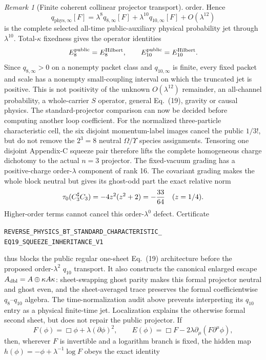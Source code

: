 \documentclass[11pt]{article}
\theoremstyle{definition}
\theoremstyle{remark}
\newtheorem{remark}[theorem]{Remark}
\begin{document}
\begin{remark}[Finite coherent collinear projector transport]
order.  Hence
\[
 \boxed{q_{\mathrm{phys},\infty}[F]
 =\lambda^8q_{8,\infty}[F]
 +\lambda^{10}q_{10,\infty}[F]+O(\lambda^{12})}
\]
is the complete selected all-time public-auxiliary physical probability jet
through $\lambda^{10}$.  Total-$\kappa$ fixedness gives the operator identities
\[
 E_8^{\rm public}=E_8^{\rm Hilbert},\qquad
 E_{10}^{\rm public}=E_{10}^{\rm Hilbert}.
\]
Since $q_{8,\infty}>0$ on a nonempty packet class and $q_{10,\infty}$ is
finite, every fixed packet and scale has a nonempty small-coupling interval
on which the truncated jet is positive.  This is not positivity of the
unknown $O(\lambda^{12})$ remainder, an all-channel probability, a
whole-carrier $S$ operator, general Eq.~(19), gravity or causal physics.
The standard-projector comparison can now be decided before computing another
loop coefficient.  For the normalized three-particle characteristic cell, the
six disjoint momentum-label images cancel the public \(1/3!\), but do not
remove the \(2^3=8\) neutral \(\Omega/\Upsilon\) species assignments.  Tensoring
one disjoint Appendix-C squeeze pair therefore lifts the complete homogeneous
charge dichotomy to the actual \(n=3\) projector.  The fixed-vacuum grading has
a positive-charge order-\(\lambda\) component of rank 16.  The covariant
grading makes the whole block neutral but gives its ghost-odd part the exact
relative norm
\[
 \tau_0(C_3^\sharp C_3)=-4z^2(z^2+2)=-{33\over64}\quad(z=1/4).
\]
Higher-order terms cannot cancel this order-\(\lambda^0\) defect.  Certificate
\par\noindent
\texttt{REVERSE\_PHYSICS\_BT\_STANDARD\_CHARACTERISTIC\_}\allowbreak
\texttt{EQ19\_SQUEEZE\_INHERITANCE\_V1}
\par\noindent
thus blocks the public regular one-sheet Eq.~(19) architecture before the
proposed order-\(\lambda^2\) \(q_{10}\) transport.  It also constructs the
canonical enlarged escape
\(A_{\rm dbl}=A\oplus\kappa A\kappa\): sheet-swapping ghost parity makes this
formal projector neutral and ghost even, and the sheet-averaged trace
preserves the formal coefficientwise \(q_8\)--\(q_{10}\) algebra.  The
time-normalization audit above prevents interpreting its \(q_{10}\) entry as
a physical finite-time jet.  Localization explains the
otherwise formal second sheet, but does not repair the public projector.  If
\[
 F(\phi)=\Box\phi+\lambda(\partial\phi)^2,
 \qquad
 E(\phi)=\Box F-2\lambda\partial_\mu(F\partial^\mu\phi),
\]
then, wherever \(F\) is invertible and a logarithm branch is fixed, the hidden
map \(h(\phi)=-\phi+\lambda^{-1}\log F\) obeys the exact identity
\[
\]
\end{remark}
\end{document}
